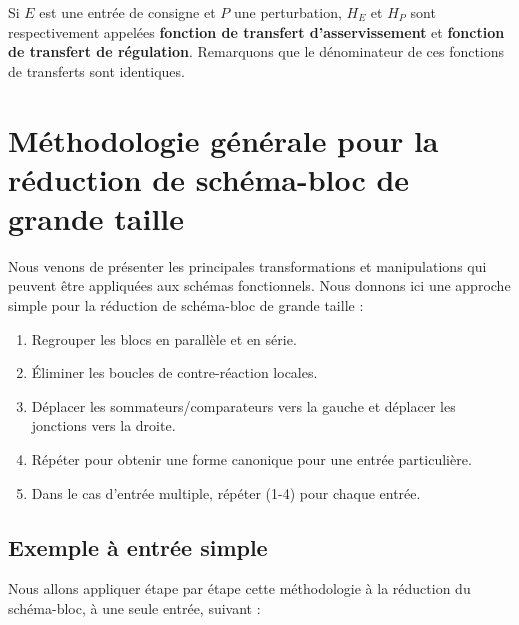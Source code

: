 Si $E$ est une entrée de consigne et $P$ une perturbation, $H_E$ et $H_P$ 
sont respectivement appelées \textbf{fonction de transfert d'asservissement} 
et \textbf{fonction de transfert de régulation}.
Remarquons que le dénominateur de ces fonctions de transferts sont identiques.

\section[Réduction de schéma-bloc de grande taille]
{Méthodologie générale pour la réduction de schéma-bloc de grande taille}

Nous venons de présenter les principales transformations et manipulations qui 
peuvent être appliquées aux schémas fonctionnels. Nous donnons ici une 
approche simple pour la réduction de schéma-bloc de grande 
taille \cite{Ostertag}:
\begin{enumerate}
    \item Regrouper les blocs en parallèle et en série.
    \item \'Eliminer les boucles de contre-réaction locales.
    \item Déplacer les sommateurs/comparateurs vers la gauche et déplacer les 
          jonctions vers la droite.
    \item Répéter pour obtenir une forme canonique pour une entrée particulière.
    \item Dans le cas d'entrée multiple, répéter (1-4) pour chaque entrée. 
\end{enumerate}

\subsection{Exemple à entrée simple}
Nous allons appliquer étape par étape cette méthodologie à la réduction du 
schéma-bloc, à une seule entrée, suivant :

